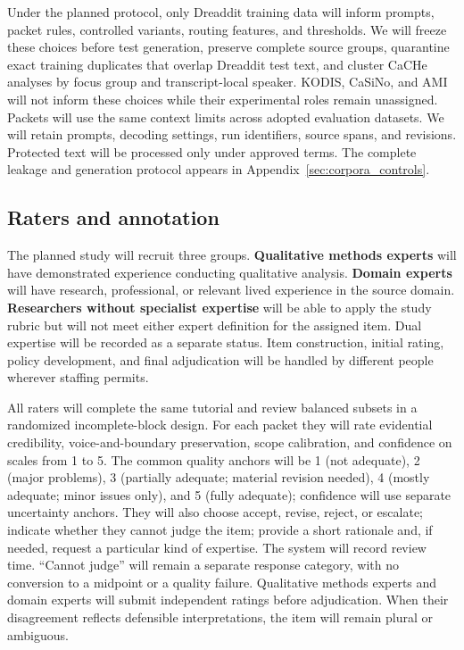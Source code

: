 Under the planned protocol, only Dreaddit training data will inform prompts,
packet rules, controlled variants, routing features, and thresholds. We will
freeze these choices before test generation, preserve complete source groups,
quarantine exact training duplicates that overlap Dreaddit test text, and
cluster CaCHe analyses by focus group and transcript-local speaker. KODIS,
CaSiNo, and AMI will not inform these choices while their experimental roles remain
unassigned. Packets will use the same context limits across adopted evaluation
datasets. We will retain prompts, decoding settings, run identifiers, source
spans, and revisions. Protected text will be processed only under approved
terms. The complete leakage and generation protocol appears in
Appendix~\ref{sec:corpora_controls}.

\subsection{Raters and annotation}

The planned study will recruit three groups. \textbf{Qualitative methods experts} will have demonstrated experience conducting qualitative analysis. \textbf{Domain experts} will have research, professional, or relevant lived experience in the source domain. \textbf{Researchers without specialist expertise} will be able to apply the study rubric but will not meet either expert definition for the assigned item. Dual expertise will be recorded as a separate status. Item construction, initial rating, policy development, and final adjudication will be handled by different people wherever staffing permits.

All raters will complete the same tutorial and review balanced subsets in a randomized incomplete-block design. For each packet they will rate evidential credibility, voice-and-boundary preservation, scope calibration, and confidence on scales from 1 to 5. The common quality anchors will be 1 (not adequate), 2 (major problems), 3 (partially adequate; material revision needed), 4 (mostly adequate; minor issues only), and 5 (fully adequate); confidence will use separate uncertainty anchors. They will also choose accept, revise, reject, or escalate; indicate whether they cannot judge the item; provide a short rationale and, if needed, request a particular kind of expertise. The system will record review time. ``Cannot judge'' will remain a separate response category, with no conversion to a midpoint or a quality failure. Qualitative methods experts and domain experts will submit independent ratings before adjudication. When their disagreement reflects defensible interpretations, the item will remain plural or ambiguous.

